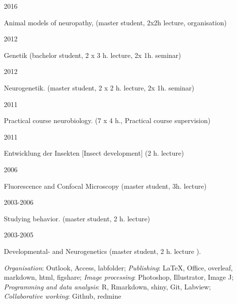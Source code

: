 \parbox{0.15\textwidth}{2016}\hfill
\parbox[t]{0.83\textwidth}{Animal models of neuropathy, (master student, 2x2h lecture, organisation)}

\parbox{0.15\textwidth}{2012}\hfill
\parbox[t]{0.83\textwidth}{Genetik (bachelor student, 2 x 3 h. lecture, 2x 1h. seminar)}
\parbox{0.15\textwidth}{2012}\hfill
\parbox[t]{0.83\textwidth}{Neurogenetik. (master student, 2 x 2 h. lecture, 2x 1h. seminar)}
\parbox{0.15\textwidth}{2011}\hfill
\parbox[t]{0.83\textwidth}{Practical course neurobiology. (7 x 4 h., Practical course supervision)}
\parbox{0.15\textwidth}{2011}\hfill
\parbox[t]{0.83\textwidth}{Entwicklung der Insekten [Insect development] (2 h. lecture)}
 
\parbox{0.15\textwidth}{2006}\hfill
\parbox[t]{0.83\textwidth}{Fluorescence and Confocal Microscopy (master student, 3h. lecture)}
\parbox{0.15\textwidth}{2003-2006}\hfill
\parbox[t]{0.83\textwidth}{Studying behavior. (master student, 2 h. lecture)}
\parbox{0.15\textwidth}{2003-2005}\hfill
\parbox[t]{0.83\textwidth}{Developmental- and Neurogenetics %
(master student, 2 h. lecture%
).}


%
%
%
%
%
%
%
%
%
%
%
%
%
\emph{Organisation}: Outlook, Access, labfolder;
\emph{Publishing}: \LaTeX, Office, overleaf, markdown, html, figshare;
\emph{Image processing}: Photoshop, Illustrator, Image J; 
\emph{Programming and data analysis}:  R, Rmarkdown, shiny, Git, Labview;
\emph{Collaborative working}:  Github, redmine


